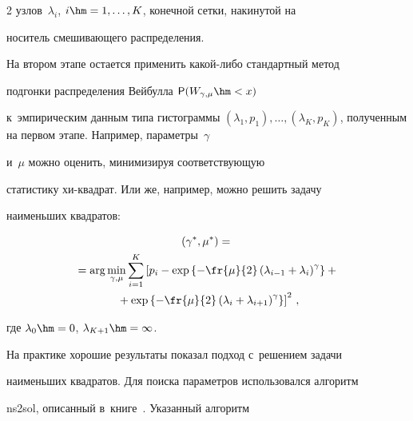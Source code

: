 \begin{multicols}{2}
узлов~$\lambda_i$, $i\hm=1,\ldots,K$, конечной сетки, накинутой на


носитель смешивающего распределения.





На втором этапе остается применить ка\-кой-ли\-бо стандартный метод


подгонки распределения Вейбулла ${\sf P}(W_{\gamma,\mu}\hm<x)$ 


к~эмпирическим данным типа гистограммы $(\lambda_1, p_1),\ldots,


(\lambda_K, p_K)$, полученным на первом этапе. Например, параметры~$\gamma$ 


и~$\mu$ можно оценить, минимизируя соответствующую


статистику хи-квад\-рат. Или же, например, можно решить задачу


наименьших квадратов:





\vspace*{-2pt}





\noindent


\begin{multline*}


(\gamma^*,\mu^*)={}\\


{}=\arg\min_{\gamma,\mu}\sum_{i=1}^K\left[p_i-


\exp\left\{-\fr{\mu}{2}\left(\lambda_{i-1}+\lambda_i\right)^{\gamma}\right\}+{}\right.\\


\left.{}+


\exp\left\{-\fr{\mu}{2}\left(\lambda_i+\lambda_{i+1}\right)^{\gamma}\right\}\right]^2\,,


\end{multline*}


где $\lambda_0\hm=0$, $\lambda_{K+1}\hm=\infty$.





\pagebreak





На практике хорошие результаты показал подход с~решением задачи


наименьших квадратов. Для поиска параметров использовался алгоритм


{\sf ns2sol}, описанный в~книге~\cite{DSch1983}. Указанный алгоритм



\end{multicols}
